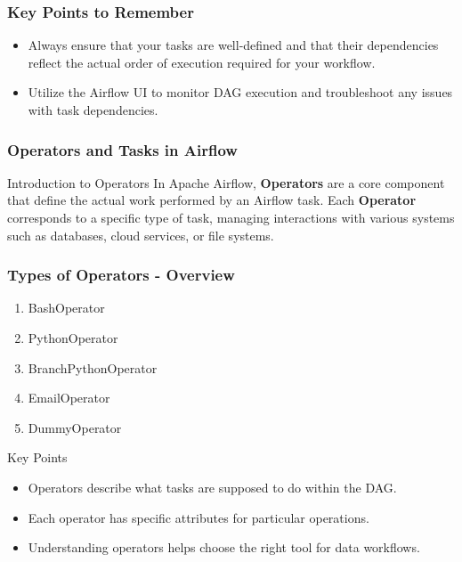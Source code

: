 \documentclass[aspectratio=169]{beamer}
\begin{document}
\begin{frame}[fragile]
    \frametitle{Key Points to Remember}
    \begin{itemize}
        \item Always ensure that your tasks are well-defined and that their dependencies reflect the actual order of execution required for your workflow.
        \item Utilize the Airflow UI to monitor DAG execution and troubleshoot any issues with task dependencies.
    \end{itemize}
\end{frame}

\begin{frame}[fragile]
    \frametitle{Operators and Tasks in Airflow}
    \begin{block}{Introduction to Operators}
        In Apache Airflow, \textbf{Operators} are a core component that define the actual work performed by an Airflow task. Each \textbf{Operator} corresponds to a specific type of task, managing interactions with various systems such as databases, cloud services, or file systems.
    \end{block}
\end{frame}

\begin{frame}[fragile]
    \frametitle{Types of Operators - Overview}
    \begin{enumerate}
        \item BashOperator
        \item PythonOperator
        \item BranchPythonOperator
        \item EmailOperator
        \item DummyOperator
    \end{enumerate}
    
    \begin{block}{Key Points}
        \begin{itemize}
            \item Operators describe what tasks are supposed to do within the DAG.
            \item Each operator has specific attributes for particular operations.
            \item Understanding operators helps choose the right tool for data workflows.
        \end{itemize}
    \end{block}
\end{frame}
\end{document}
